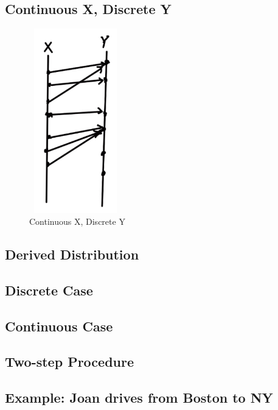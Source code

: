 \subsection{Continuous X, Discrete Y}


\begin{figure}[h]
\centering
\includegraphics[width=4cm, height=8cm]{images/L10/continuous_discrete.jpeg}
\caption{Continuous X, Discrete Y}
\end{figure}

\subsection{Derived Distribution}


\subsection{Discrete Case}


\subsection{Continuous Case}


\subsection{Two-step Procedure}


\subsection{Example: Joan drives from Boston to NY}

